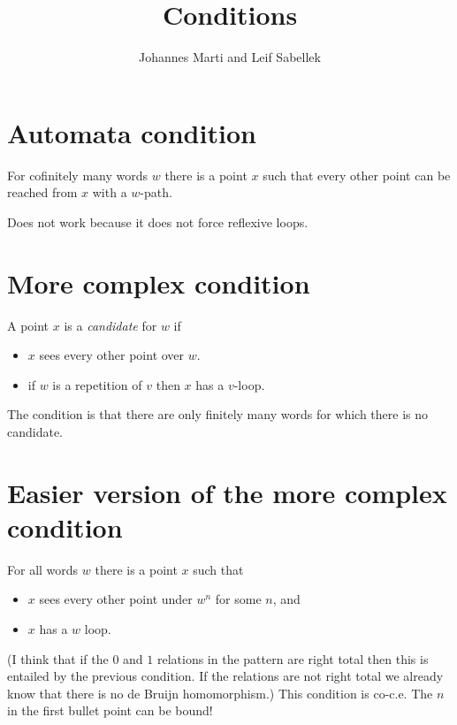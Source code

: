 \documentclass[a4paper]{article}
\title{Conditions}
\author{Johannes Marti and Leif Sabellek}
\begin{document}
\maketitle


\section{Automata condition}

For cofinitely many words $w$ there is a point $x$ such that every other
point can be reached from $x$ with a $w$-path.

Does not work because it does not force reflexive loops.


\section{More complex condition}

A point $x$ is a \emph{candidate} for $w$ if
\begin{itemize}
 \item $x$ sees every other point over $w$.
 \item if $w$ is a repetition of $v$ then $x$ has a $v$-loop.
\end{itemize}

The condition is that there are only finitely many words for which there
is no candidate.


\section{Easier version of the more complex condition}

For all words $w$ there is a point $x$ such that
\begin{itemize}
 \item $x$ sees every other point under $w^n$ for some $n$, and
 \item $x$ has a $w$ loop.
\end{itemize}

(I think that if the $0$ and $1$ relations in the pattern are right
total then this is entailed by the previous condition. If
the relations are not right total we already know that there is no de
Bruijn homomorphism.)
This condition is co-c.e. The $n$ in the first bullet point can
be bound!
\end{document}
